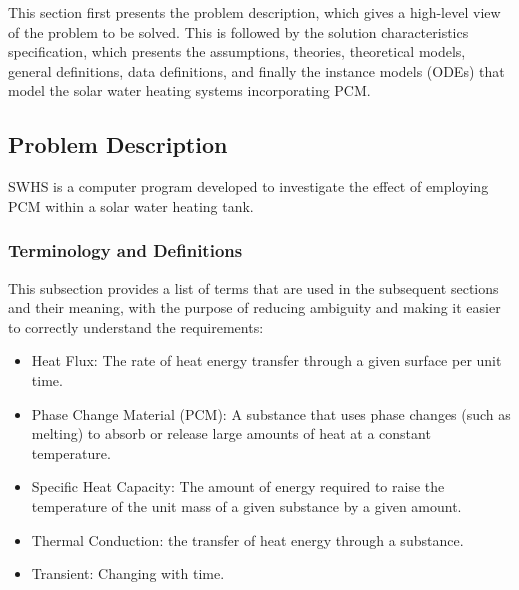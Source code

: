 \documentclass[12pt]{article}
\newcommand{\progname}{SWHS}
\begin{document}
This section first presents the problem description, which gives a high-level
view of the problem to be solved. This is followed by the solution
characteristics specification, which presents the assumptions, theories,
theoretical models, general definitions, data definitions, and finally the
instance models (ODEs) that model the solar water heating systems incorporating
PCM.

\subsection{Problem Description} \label{Sec_pd}

\progname{} is a computer program developed to investigate the effect of
employing PCM within a solar water heating tank.


\subsubsection{Terminology and  Definitions}

This subsection provides a list of terms that are used in the subsequent
sections and their meaning, with the purpose of reducing ambiguity and making it
easier to correctly understand the requirements:

\begin{itemize}

\item Heat Flux: The rate of heat energy transfer through a given surface per unit time.

\item Phase Change Material (PCM): A substance that uses phase changes (such as melting)
  to absorb or release large amounts of heat at a constant temperature.

\item Specific Heat Capacity: The amount of energy required to raise the
  temperature of the unit mass of a given substance by a given amount.

\item Thermal Conduction: the transfer of heat energy through a substance.

\item Transient: Changing with time.

\end{itemize}
\end{document}
